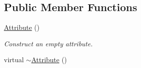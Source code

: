 \subsection*{Public Member Functions}
\begin{DoxyCompactItemize}
\item 
\hypertarget{classphys_1_1xml_1_1Attribute_a962ad273e447bb714925c331e00cc3e7}{
\hyperlink{classphys_1_1xml_1_1Attribute_a962ad273e447bb714925c331e00cc3e7}{Attribute} ()}
\label{da/ddf/classphys_1_1xml_1_1Attribute_a962ad273e447bb714925c331e00cc3e7}

\begin{DoxyCompactList}\small\item\em Construct an empty attribute. \item\end{DoxyCompactList}\item 
\hypertarget{classphys_1_1xml_1_1Attribute_a2918dbce8208751944d3803a1300a914}{
virtual \hyperlink{classphys_1_1xml_1_1Attribute_a2918dbce8208751944d3803a1300a914}{$\sim$Attribute} ()}
\label{da/ddf/classphys_1_1xml_1_1Attribute_a2918dbce8208751944d3803a1300a914}


\end{DoxyCompactItemize}
